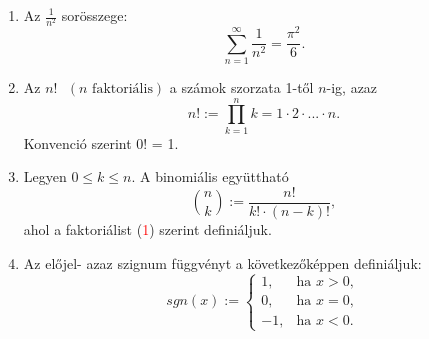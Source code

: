 \documentclass{article}
\begin{document}
    \begin{enumerate}[label=\alph*)]
    \item 
        Az $ \frac{1}{n^2} $ sorösszege:
            \[ \sum_{n=1}^{\infty} \frac{1}{n^2} = \frac{\pi^2}{6}. \]
    
    \item
        Az $n!\text{ }(n \text{ faktoriális})$ a számok szorzata 1-től $n$-ig, azaz
            \begin{equation}
                n! := \prod_{k=1}^n k = 1\cdot2\cdot...\cdot n.
            \end{equation}
        Konvenció szerint 0! = 1.
    
    \item
        Legyen $0 \leq k \leq n. $ A binomiális együttható
            \[ \binom{n}{k} := \frac{n!}{k! \cdot (n-k)!}, \]
        ahol a faktoriálist (\textcolor{red}{1}) szerint definiáljuk.
    
    \item
        Az előjel- azaz szignum függvényt a következőképpen definiáljuk:
            \[ sgn(x) := \begin{cases}
                            1, & \text{ha } x > 0, \\
                            0, & \text{ha } x = 0, \\
                            -1, & \text{ha } x < 0.
                         \end{cases}\]
                     
    \end{enumerate}
\end{document}
